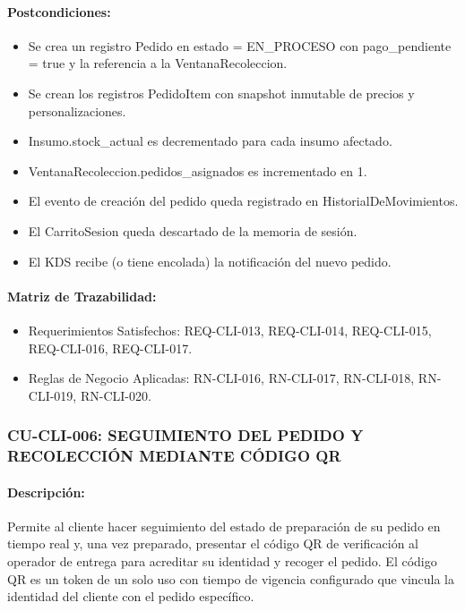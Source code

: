 \paragraph{Postcondiciones:}
\begin{itemize}
    \item Se crea un registro Pedido en estado = EN\_PROCESO con pago\_pendiente = true y la referencia a la VentanaRecoleccion.
    \item Se crean los registros PedidoItem con snapshot inmutable de precios y personalizaciones.
    \item Insumo.stock\_actual es decrementado para cada insumo afectado.
    \item VentanaRecoleccion.pedidos\_asignados es incrementado en 1.
    \item El evento de creación del pedido queda registrado en HistorialDeMovimientos.
    \item El CarritoSesion queda descartado de la memoria de sesión.
    \item El KDS recibe (o tiene encolada) la notificación del nuevo pedido.
\end{itemize}

\paragraph{Matriz de Trazabilidad:}
\begin{itemize}
    \item Requerimientos Satisfechos: REQ-CLI-013, REQ-CLI-014, REQ-CLI-015, REQ-CLI-016, REQ-CLI-017.
    \item Reglas de Negocio Aplicadas: RN-CLI-016, RN-CLI-017, RN-CLI-018, RN-CLI-019, RN-CLI-020.
\end{itemize}

\subsubsection{CU-CLI-006: SEGUIMIENTO DEL PEDIDO Y RECOLECCIÓN MEDIANTE CÓDIGO QR}
\paragraph{Descripción:} Permite al cliente hacer seguimiento del estado de preparación de su pedido en tiempo real y, una vez preparado, presentar el código QR de verificación al operador de entrega para acreditar su identidad y recoger el pedido. El código QR es un token de un solo uso con tiempo de vigencia configurado que vincula la identidad del cliente con el pedido específico.

